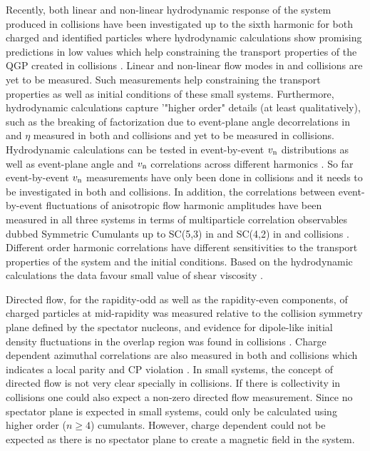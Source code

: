 \documentclass[../report.tex]{subfiles}
\begin{document}
Recently, both linear and non-linear hydrodynamic response of the system produced in \PbPb collisions have been investigated up to the sixth harmonic for both charged and identified particles where hydrodynamic calculations show promising predictions in low \pt values which help constraining the transport properties of the QGP created in \PbPb collisions \cite{Acharya:2017zfg}. Linear and non-linear flow modes in \pp and \pPb collisions are yet to be measured. Such measurements help constraining the transport properties as well as initial conditions of these small systems. Furthermore, hydrodynamic calculations capture '"higher order" details (at least qualitatively), such as the breaking of factorization due to event-plane angle decorrelations in \pt and $\eta$ measured in both \PbPb and \pPb collisions \cite{Khachatryan:2015oea,Sirunyan:2017gyb,Acharya:2017ino} and yet to be measured in \pp collisions. Hydrodynamic calculations can be tested in event-by-event $v_{\rm{n}}$ distributions as well as event-plane angle and $v_{\rm{n}}$ correlations across different harmonics \cite{Aad:2014fla,Aad:2015lwa,ALICE:2016kpq,Sirunyan:2017uyl}. So far event-by-event $v_{\rm{n}}$ measurements have only been done in \PbPb collisions \cite{Aad:2013xma,Sirunyan:2017fts} and it needs to be investigated in both \pPb and \pp collisions. In addition, the correlations between event-by-event fluctuations of anisotropic flow harmonic amplitudes have been measured in all three systems in terms of multiparticle correlation observables dubbed Symmetric Cumulants up to SC(5,3) in \PbPb and SC(4,2) in \pPb and \pp collisions \cite{Sirunyan:2017uyl,Acharya:2017gsw,ATLAS-CONF-2018-012}. Different order harmonic correlations have different sensitivities to the transport properties of the system and the initial conditions. Based on the hydrodynamic calculations the data favour small value of shear viscosity \cite{Zhu:2016puf}.

Directed flow, for the rapidity-odd as well as the rapidity-even components, of charged particles at mid-rapidity was measured relative to the collision symmetry plane defined by the spectator nucleons, and evidence for dipole-like initial density fluctuations in the overlap region was found in \PbPb collisions \cite{Abelev:2013cva}. Charge dependent azimuthal correlations are also measured in both \PbPb and \pPb collisions which indicates a local parity and CP violation \cite{Adam:2015vje,Sirunyan:2017tax,Acharya:2017fau,Sirunyan:2017quh,Khachatryan:2016got}. In small systems, the concept of directed flow is not very clear specially in \pp collisions. If there is collectivity in \pp collisions one could also expect a non-zero directed flow measurement. Since no spectator plane is expected in small systems, \vone could only be calculated using higher order ($n\geq 4$) cumulants. However, charge dependent \vone could not be expected as there is no spectator plane to create a magnetic field in the system. 
\end{document}
